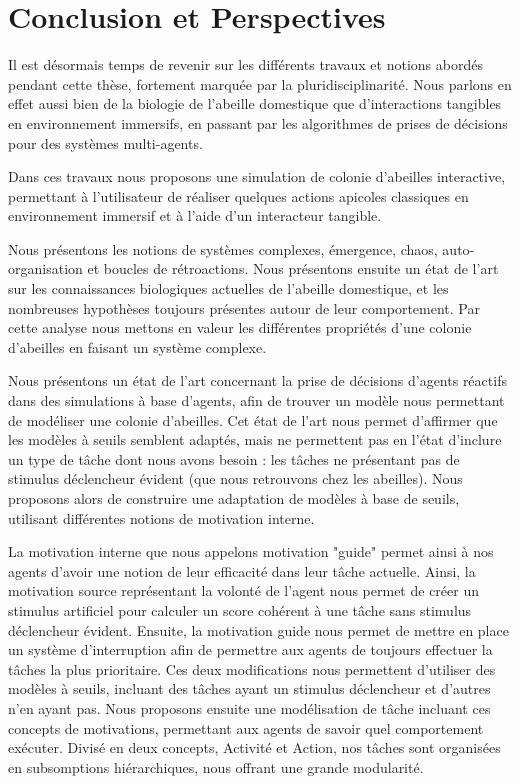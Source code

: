 \chapter*{Conclusion et Perspectives}

Il est désormais temps de revenir sur les différents travaux et notions abordés pendant cette thèse, fortement marquée par la pluridisciplinarité. Nous parlons en effet aussi bien de la biologie de l'abeille domestique que d'interactions tangibles en environnement immersifs, en passant par les algorithmes de prises de décisions pour des systèmes multi-agents.

Dans ces travaux nous proposons une simulation de colonie d'abeilles interactive, permettant à l'utilisateur de réaliser quelques actions apicoles classiques en environnement immersif et à l'aide d'un interacteur tangible.

Nous présentons les notions de systèmes complexes, émergence, chaos, auto-organisation et boucles de rétroactions. Nous présentons ensuite un état de l'art sur les connaissances biologiques actuelles de l'abeille domestique, et les nombreuses hypothèses toujours présentes autour de leur comportement. Par cette analyse nous mettons en valeur les différentes propriétés d'une colonie d'abeilles en faisant un système complexe.

Nous présentons un état de l'art concernant la prise de décisions d'agents réactifs dans des simulations à base d'agents, afin de trouver un modèle nous permettant de modéliser une colonie d'abeilles. Cet état de l'art nous permet d'affirmer que les modèles à seuils semblent adaptés, mais ne permettent pas en l'état d'inclure un type de tâche dont nous avons besoin : les tâches ne présentant pas de stimulus déclencheur évident (que nous retrouvons chez les abeilles). Nous proposons alors de construire une adaptation de modèles à base de seuils, utilisant différentes notions de motivation interne.

La motivation interne que nous appelons motivation "guide" permet ainsi à nos agents d'avoir une notion de leur efficacité dans leur tâche actuelle. Ainsi, la motivation source représentant la volonté de l'agent nous permet de créer un stimulus artificiel pour calculer un score cohérent à une tâche sans stimulus déclencheur évident. Ensuite, la motivation guide nous permet de mettre en place un système d'interruption afin de permettre aux agents de toujours effectuer la tâches la plus prioritaire. Ces deux modifications nous permettent d'utiliser des modèles à seuils, incluant des tâches ayant un stimulus déclencheur et d'autres n'en ayant pas. Nous proposons ensuite une modélisation de tâche incluant ces concepts de motivations, permettant aux agents de savoir quel comportement exécuter. Divisé en deux concepts, Activité et Action, nos tâches sont organisées en subsomptions hiérarchiques, nous offrant une grande modularité.

